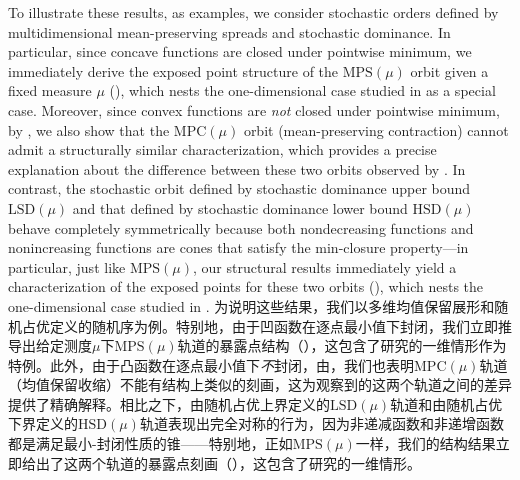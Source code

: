 \documentclass[12pt,letterpaper]{article}
\newenvironment{original}{\color{black}}{}
\newenvironment{translation}{\color{blue}}{}
\theoremstyle{plain}
\theoremstyle{definition}
\theoremstyle{remark}
\theoremstyle{definition}
\begin{document}
\begin{original}
To illustrate these results, as examples, we consider stochastic orders defined by multidimensional mean-preserving spreads and stochastic dominance. In particular, since concave functions are closed under pointwise minimum, we immediately derive the exposed point structure of the $\mathrm{MPS}(\mu)$ orbit given a fixed measure $\mu$ (), which nests the one-dimensional case studied in \citet*{kleiner2021extreme} as a special case. Moreover, since convex functions are \textit{not} closed under pointwise minimum, by , we also show that the $\mathrm{MPC}(\mu)$ orbit (mean-preserving contraction) cannot admit a structurally similar characterization, which provides a precise explanation about the difference between these two orbits observed by \citet*{kleiner2021extreme}. In contrast, the stochastic orbit defined by stochastic dominance upper bound $\mathrm{LSD}(\mu)$ and that defined by stochastic dominance lower bound $\mathrm{HSD}(\mu)$ behave completely symmetrically because both nondecreasing functions and nonincreasing functions are cones that satisfy the min-closure property---in particular, just like $\mathrm{MPS}(\mu)$, our structural results immediately yield a characterization of the exposed points for these two orbits (), which nests the one-dimensional case studied in \citet{yang2024monotone}.
\end{original}
\begin{translation}
为说明这些结果，我们以多维均值保留展形和随机占优定义的随机序为例。特别地，由于凹函数在逐点最小值下封闭，我们立即推导出给定测度$\mu$下$\mathrm{MPS}(\mu)$轨道的暴露点结构（），这包含了\citet*{kleiner2021extreme}研究的一维情形作为特例。此外，由于凸函数在逐点最小值下\textit{不}封闭，由，我们也表明$\mathrm{MPC}(\mu)$轨道（均值保留收缩）不能有结构上类似的刻画，这为\citet*{kleiner2021extreme}观察到的这两个轨道之间的差异提供了精确解释。相比之下，由随机占优上界定义的$\mathrm{LSD}(\mu)$轨道和由随机占优下界定义的$\mathrm{HSD}(\mu)$轨道表现出完全对称的行为，因为非递减函数和非递增函数都是满足最小-封闭性质的锥——特别地，正如$\mathrm{MPS}(\mu)$一样，我们的结构结果立即给出了这两个轨道的暴露点刻画（），这包含了\citet{yang2024monotone}研究的一维情形。
\end{translation}
\end{document}
